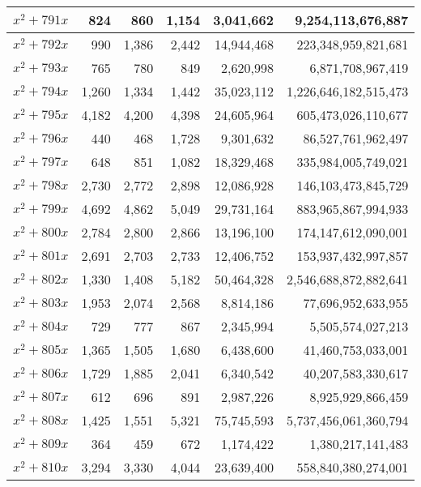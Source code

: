 \documentclass[a4paper]{amsproc}
\theoremstyle{plain}
\begin{document}
\begin{longtable}{ | l | r | r | r | r | r | }
$x^2 + 791x$ & 824 & 860 & 1{,}154 & 3{,}041{,}662 & 9{,}254{,}113{,}676{,}887 \\ \hline
$x^2 + 792x$ & 990 & 1{,}386 & 2{,}442 & 14{,}944{,}468 & 223{,}348{,}959{,}821{,}681 \\ \hline
$x^2 + 793x$ & 765 & 780 & 849 & 2{,}620{,}998 & 6{,}871{,}708{,}967{,}419 \\ \hline
$x^2 + 794x$ & 1{,}260 & 1{,}334 & 1{,}442 & 35{,}023{,}112 & 1{,}226{,}646{,}182{,}515{,}473 \\ \hline
$x^2 + 795x$ & 4{,}182 & 4{,}200 & 4{,}398 & 24{,}605{,}964 & 605{,}473{,}026{,}110{,}677 \\ \hline
$x^2 + 796x$ & 440 & 468 & 1{,}728 & 9{,}301{,}632 & 86{,}527{,}761{,}962{,}497 \\ \hline
$x^2 + 797x$ & 648 & 851 & 1{,}082 & 18{,}329{,}468 & 335{,}984{,}005{,}749{,}021 \\ \hline
$x^2 + 798x$ & 2{,}730 & 2{,}772 & 2{,}898 & 12{,}086{,}928 & 146{,}103{,}473{,}845{,}729 \\ \hline
$x^2 + 799x$ & 4{,}692 & 4{,}862 & 5{,}049 & 29{,}731{,}164 & 883{,}965{,}867{,}994{,}933 \\ \hline
$x^2 + 800x$ & 2{,}784 & 2{,}800 & 2{,}866 & 13{,}196{,}100 & 174{,}147{,}612{,}090{,}001 \\ \hline
$x^2 + 801x$ & 2{,}691 & 2{,}703 & 2{,}733 & 12{,}406{,}752 & 153{,}937{,}432{,}997{,}857 \\ \hline
$x^2 + 802x$ & 1{,}330 & 1{,}408 & 5{,}182 & 50{,}464{,}328 & 2{,}546{,}688{,}872{,}882{,}641 \\ \hline
$x^2 + 803x$ & 1{,}953 & 2{,}074 & 2{,}568 & 8{,}814{,}186 & 77{,}696{,}952{,}633{,}955 \\ \hline
$x^2 + 804x$ & 729 & 777 & 867 & 2{,}345{,}994 & 5{,}505{,}574{,}027{,}213 \\ \hline
$x^2 + 805x$ & 1{,}365 & 1{,}505 & 1{,}680 & 6{,}438{,}600 & 41{,}460{,}753{,}033{,}001 \\ \hline
$x^2 + 806x$ & 1{,}729 & 1{,}885 & 2{,}041 & 6{,}340{,}542 & 40{,}207{,}583{,}330{,}617 \\ \hline
$x^2 + 807x$ & 612 & 696 & 891 & 2{,}987{,}226 & 8{,}925{,}929{,}866{,}459 \\ \hline
$x^2 + 808x$ & 1{,}425 & 1{,}551 & 5{,}321 & 75{,}745{,}593 & 5{,}737{,}456{,}061{,}360{,}794 \\ \hline
$x^2 + 809x$ & 364 & 459 & 672 & 1{,}174{,}422 & 1{,}380{,}217{,}141{,}483 \\ \hline
$x^2 + 810x$ & 3{,}294 & 3{,}330 & 4{,}044 & 23{,}639{,}400 & 558{,}840{,}380{,}274{,}001 \\ \hline

\end{longtable}
\end{document}
